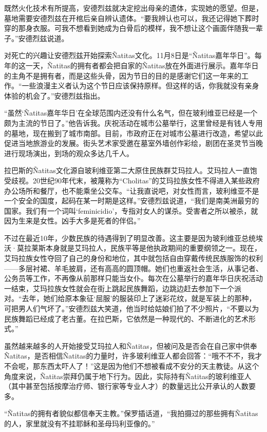 \documentclass[12pt,oneside]{book}
\begin{document}
\begin{bookref}[frametitle={\cite{好好告别：世界葬礼观察手记}}]
既然火化技术有所提高，安德烈兹就决定挖出母亲的遗体，实现她的愿望。但是，墓地需要安德烈兹在开棺后亲自辨认遗体。“要我辨认也可以，我还记得她下葬时穿的那身衣服。可我不想看到她成为白骨后的模样，我不想让这个画面伴随我一辈子。”安德烈兹说道。

对死亡的兴趣让安德烈兹开始探索Ñatitas文化。11月8日是“Ñatitas嘉年华日”。每年的这一天，Ñatitas的拥有者都会把自家的Ñatitas放在外面进行展示。嘉年华日的主角不是拥有者，而是这些头骨，因为节日的目的是感谢它们这一年来的工作。“一些浪漫主义者认为这个节日应该保持原样。但这样的话，你我就没有亲身体验的机会了。”安德烈兹指出。

“虽然‘Ñatitas嘉年华日’在全球范围内还没有什么名气，但在玻利维亚已经是一个颇为主流的节日了。”他告诉我。庆祝活动在城市公墓举行，这里曾经是有钱人专用的墓地，现在搬到了城市南部。目前，市政府正在对城市公墓进行改造，希望以此促进当地旅游业的发展。街头艺术家受邀在墓室外墙创作彩绘，剧团在圣灵节当晚进行现场演出，到场的观众多达几千人。

拉巴斯的Ñatitas文化源自玻利维亚第二大原住民族群艾玛拉人。艾玛拉人一直饱受歧视。20世纪90年代末，被蔑称为“Cholitas”的艾玛拉族女性不得进入某些政府办公场所和餐厅，也不能乘坐公交车。“让我直说吧，对女性而言，玻利维亚不是一个安全的国度，起码在某一时期是这样。”安德烈兹说道，“我们是南美洲最穷的国家。我们有一个词叫‘feminicidio’，专指对女人的谋杀。受害者之所以被杀，就因为生来是女性。凶手大多是死者的伴侣。”

不过在最近10年，少数民族的待遇得到了明显改善。这主要是因为玻利维亚总统埃沃·莫拉莱斯本身就是艾玛拉人，民族平等是他执政期间的重要纲领之一。现在，艾玛拉族女性夺回了自己的身份和地位，其中就包括自由穿戴传统民族服饰的权利——多层衬裙、羊毛披肩，还有高高的圆顶帽。她们也重返社会生活，从事记者、公务员等工作，不再像从前那样只能当女仆。每次在公墓举行的嘉年华日庆祝活动一结束，艾玛拉族女性就会在街上跳起民族舞蹈，边跳边赶去参加下一个派对。“去年，她们给原本象征‘屈服’的服装印上了迷彩花纹，就是军装上的那种，可把男人们气坏了。”安德烈兹大笑道，他当时给姑娘们拍了不少照片，“不要以为民族舞蹈已经成了老古董。在拉巴斯，它依然是一种现代的、不断进化的艺术形式。”

虽然越来越多的人开始接受艾玛拉人和Ñatitas，但被问及是否会在自己家中供奉Ñatitas，是否相信Ñatitas的力量时，许多玻利维亚人都会回答：“哦不不不，我才不会呢，那东西太吓人了！”这是因为他们不想被看成不安分的天主教徒。从这个角度来说，Ñatitas崇拜仍属于地下行为。因此，实际持有Ñatitas的玻利维亚人（其中甚至包括按摩治疗师、银行家等专业人才）的数量远比公开承认的人数要多。

“Ñatitas的拥有者貌似都信奉天主教。”保罗插话道，“我拍摄过的那些拥有Ñatitas的人，家里就没有不挂耶稣和圣母玛利亚像的。”


\end{bookref}
\end{document}
